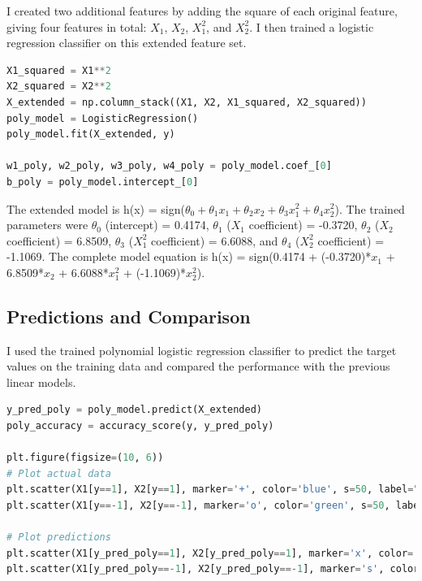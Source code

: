 \documentclass[12pt,a4paper]{article}
\begin{document}
I created two additional features by adding the square of each original feature, giving four features in total: $X_1$, $X_2$, $X_1^2$, and $X_2^2$. I then trained a logistic regression classifier on this extended feature set.

\begin{lstlisting}[language=Python, caption={Extended Feature Set}]
X1_squared = X1**2
X2_squared = X2**2
X_extended = np.column_stack((X1, X2, X1_squared, X2_squared))
poly_model = LogisticRegression()
poly_model.fit(X_extended, y)

w1_poly, w2_poly, w3_poly, w4_poly = poly_model.coef_[0]
b_poly = poly_model.intercept_[0]
\end{lstlisting}

The extended model is h(x) = sign($\theta_0 + \theta_1 x_1 + \theta_2 x_2 + \theta_3 x_1^2 + \theta_4 x_2^2$). The trained parameters were $\theta_0$ (intercept) = 0.4174, $\theta_1$ ($X_1$ coefficient) = -0.3720, $\theta_2$ ($X_2$ coefficient) = 6.8509, $\theta_3$ ($X_1^2$ coefficient) = 6.6088, and $\theta_4$ ($X_2^2$ coefficient) = -1.1069. The complete model equation is h(x) = sign(0.4174 + (-0.3720)*$x_1$ + 6.8509*$x_2$ + 6.6088*$x_1^2$ + (-1.1069)*$x_2^2$).

\subsection{Predictions and Comparison}

I used the trained polynomial logistic regression classifier to predict the target values on the training data and compared the performance with the previous linear models.

\begin{lstlisting}[language=Python, caption={Predictions and comparison}]
y_pred_poly = poly_model.predict(X_extended)
poly_accuracy = accuracy_score(y, y_pred_poly)

plt.figure(figsize=(10, 6))
# Plot actual data
plt.scatter(X1[y==1], X2[y==1], marker='+', color='blue', s=50, label="Actual +1")
plt.scatter(X1[y==-1], X2[y==-1], marker='o', color='green', s=50, label="Actual -1")

# Plot predictions
plt.scatter(X1[y_pred_poly==1], X2[y_pred_poly==1], marker='x', color='cyan', s=50, label="Predicted +1")
plt.scatter(X1[y_pred_poly==-1], X2[y_pred_poly==-1], marker='s', color='orange', s=50, label="Predicted -1")
\end{lstlisting}
\end{document}
